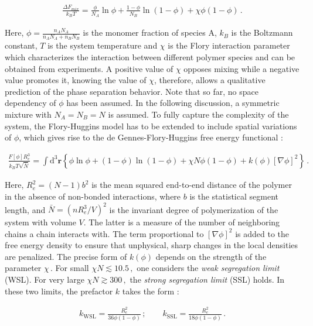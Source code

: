\documentclass[bachelor,       %
               twoside,        %
               BCOR10mm,       %
                ngerman,english  %
               ]{GAUBM}
\begin{document}
\begin{align}
  \frac{\Delta F_{mix}}{k_BT}=\frac{\phi}{N_A}\ln\phi+\frac{1-\phi}{N_B}\ln(1-\phi)+\chi\phi(1-\phi)\,.
\end{align}

Here, $\phi=\frac{n_AN_A}{n_AN_A+n_BN_B}$ is the monomer fraction of species A, $k_B$ is the Boltzmann constant, $T$ is the system temperature and $\chi$ is the Flory interaction parameter which characterizes the interaction between different polymer species and can be obtained from experiments. A positive value of $\chi$ opposes mixing while a negative value promotes it, knowing the value of $\chi$, therefore, allows a qualitative prediction of the phase separation behavior. Note that so far, no space dependency of $\phi$ has been assumed. In the following discussion, a symmetric mixture with $N_A=N_B=N$ is assumed. To fully capture the complexity of the system, the Flory-Huggins model has to be extended to include spatial variations of $\phi$, which gives rise to the de Gennes-Flory-Huggins free energy functional  \cite{deGennes80, Reister02}:


\begin{align}
  \frac{F[\phi]R_e^3}{k_BT\sqrt{\bar N}}=\int \mathrm{d}^3\mathbf{r}\left\{\phi\ln\phi+(1-\phi)\ln(1-\phi)+\chi N\phi(1-\phi)+k(\phi)[\nabla\phi]^2\right\}\,.
  \label{eq:flory_fctl}
\end{align}

Here, $R_e^2=(N-1)b^2$ is the mean squared end-to-end distance of the polymer in the absence of non-bonded interactions, where $b$ is the statistical segment length, and $\bar N=\left(nR_e^3/V\right)^2$ is the invariant degree of polymerization of the system with volume $V$. The latter is a measure of the number of neighboring chains a chain interacts with. The term proportional to $[\nabla\phi]^2$ is added to the free energy density to ensure that unphysical, sharp changes in the local densities are penalized. The precise form of $k(\phi)$ depends on the strength of the parameter $\chi\,$. For small $\chi N\lesssim 10.5\,,$ one considers the \textit{weak segregation limit} (WSL). For very large $\chi N\gtrsim300\,,$ the \textit{strong segregation limit} (SSL) holds. In these two limits, the prefactor $k$ takes the form \cite{Reister02}:

\begin{align}
  k_\mathrm{WSL}=\frac{R_e^2}{36\phi(1-\phi)}\,;\qquad k_\mathrm{SSL}=\frac{R_e^2}{18\phi(1-\phi)}\,.
\end{align}
\end{document}
